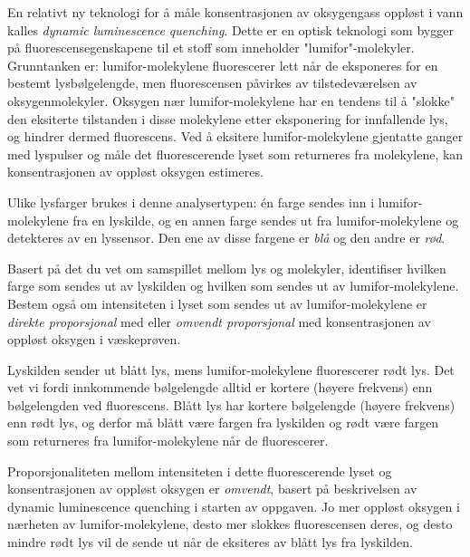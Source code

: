 

En relativt ny teknologi for å måle konsentrasjonen av oksygengass oppløst i vann kalles {\it dynamic luminescence quenching}. Dette er en optisk teknologi som bygger på fluorescensegenskapene til et stoff som inneholder "lumifor"-molekyler. Grunntanken er: lumifor-molekylene fluorescerer lett når de eksponeres for en bestemt lysbølgelengde, men fluorescensen påvirkes av tilstedeværelsen av oksygenmolekyler. Oksygen nær lumifor-molekylene har en tendens til å "slokke" den eksiterte tilstanden i disse molekylene etter eksponering for innfallende lys, og hindrer dermed fluorescens. Ved å eksitere lumifor-molekylene gjentatte ganger med lyspulser og måle det fluorescerende lyset som returneres fra molekylene, kan konsentrasjonen av oppløst oksygen estimeres.

\vskip 10pt

Ulike lysfarger brukes i denne analysertypen: én farge sendes inn i lumifor-molekylene fra en lyskilde, og en annen farge sendes ut fra lumifor-molekylene og detekteres av en lyssensor. Den ene av disse fargene er {\it blå} og den andre er {\it rød}.

\vskip 10pt

Basert på det du vet om samspillet mellom lys og molekyler, identifiser hvilken farge som sendes ut av lyskilden og hvilken som sendes ut av lumifor-molekylene. Bestem også om intensiteten i lyset som sendes ut av lumifor-molekylene er {\it direkte proporsjonal} med eller {\it omvendt proporsjonal} med konsentrasjonen av oppløst oksygen i væskeprøven.







Lyskilden sender ut blått lys, mens lumifor-molekylene fluorescerer rødt lys. Det vet vi fordi innkommende bølgelengde alltid er kortere (høyere frekvens) enn bølgelengden ved fluorescens. Blått lys har kortere bølgelengde (høyere frekvens) enn rødt lys, og derfor må blått være fargen fra lyskilden og rødt være fargen som returneres fra lumifor-molekylene når de fluorescerer.

\vskip 10pt

Proporsjonaliteten mellom intensiteten i dette fluorescerende lyset og konsentrasjonen av oppløst oksygen er {\it omvendt}, basert på beskrivelsen av dynamic luminescence quenching i starten av oppgaven. Jo mer oppløst oksygen i nærheten av lumifor-molekylene, desto mer slokkes fluorescensen deres, og desto mindre rødt lys vil de sende ut når de eksiteres av blått lys fra lyskilden.









